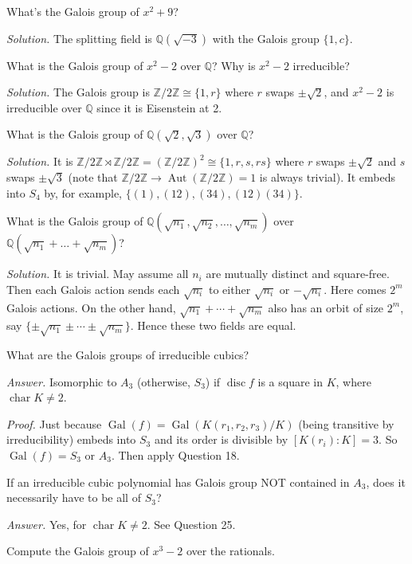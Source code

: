 \documentclass{mathproblems}
\newcommand\Q{\mathbb{Q}}
\newcommand\Z{\mathbb{Z}}
\DeclareMathOperator{\Gal}{Gal}
\begin{document}
\begin{questions}
\miquestion
{\color{blue} What's the Galois group of $x^{2}+9$?}

\textit{Solution.} The splitting field is $\Q(\sqrt{-3})$ with the Galois group $\{1,c\}$.

\miquestion
{\color{blue} What is the Galois group of $x^{2}-2$ over $\Q$? Why is $x^{2}-2$ irreducible?}

\textit{Solution.}
The Galois group is $\Z/2\Z\cong \{1,r\}$ where $r$ swaps $\pm\sqrt{2}$, and $x^{2}-2$ is irreducible over $\Q$ since it is Eisenstein at 2.

\miquestion
{\color{blue} What is the Galois group of $\Q(\sqrt{2}, \sqrt{3})$ over $\Q$?}

\textit{Solution.}
It is $\Z/2\Z \rtimes \Z/2\Z = (\Z/2\Z)^2 \cong \{1,r,s,rs\}$ where $r$ swaps $\pm \sqrt{2}$ and $s$ swaps $\pm \sqrt{3}$ (note that $\Z/2\Z\to \operatorname{Aut}(\Z/2\Z)=1$ is always trivial). It embeds into $S_4$ by, for example, $\{(1),(12),(34),(12)(34)\}$.

\miquestion
{\color{blue} What is the Galois group of $\Q(\sqrt{n_{1}}, \sqrt{n_{2}}, \ldots, \sqrt{n_{m}})$ over $\Q(\sqrt{n_{1}}+\ldots+\sqrt{n_{m}})$?}

\textit{Solution.} It is trivial. May assume all $n_i$ are mutually distinct and square-free. Then each Galois action sends each $\sqrt{n_i}$ to either $\sqrt{n_i}$ or $-\sqrt{n_i}$. Here comes $2^m$ Galois actions. On the other hand, $\sqrt{n_1}+\cdots+\sqrt{n_m}$ also has an orbit of size $2^m$, say $\{\pm\sqrt{n_1}\pm\cdots\pm\sqrt{n_m}\}$. Hence these two fields are equal.

\miquestion
{\color{blue} What are the Galois groups of irreducible cubics?}

\textit{Answer.}
Isomorphic to $A_3$ (otherwise, $S_3$) if $\operatorname{disc} f$ is a square in $K$, where $\operatorname{char} K\neq 2$. 

\textit{Proof.}
Just because $\Gal(f)=\Gal(K(r_1,r_2,r_3)/K)$ (being transitive by irreducibility) embeds into $S_3$  and its order is divisible by $[K(r_i):K]=3$. So $\Gal(f)=S_3$ or $A_3$. Then apply Question 18.


\miquestion
{\color{blue} If an irreducible cubic polynomial has Galois group NOT contained in $A_{3}$, does it necessarily have to be all of $S_{3}$?}

\textit{Answer.}
Yes, for $\operatorname{char} K\neq 2$. See Question 25.

\miquestion
{\color{blue} Compute the Galois group of $x^{3}-2$ over the rationals.}


\end{questions}
\end{document}
